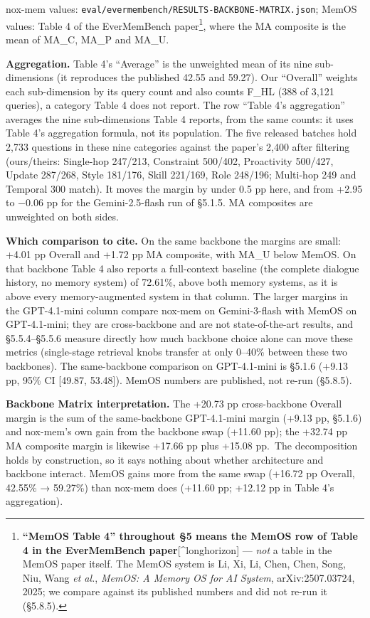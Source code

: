 \documentclass[
]{article}
\begin{document}
nox-mem values: \texttt{eval/evermembench/RESULTS-BACKBONE-MATRIX.json};
MemOS values: Table 4 of the EverMemBench paper\footnote{\textbf{``MemOS
  Table 4'' throughout §5 means the MemOS row of Table 4 in the
  EverMemBench paper}{[}\^{}longhorizon{]} --- \emph{not} a table in the
  MemOS paper itself. The MemOS system is Li, Xi, Li, Chen, Chen, Song,
  Niu, Wang \emph{et al.}, \emph{MemOS: A Memory OS for AI System},
  arXiv:2507.03724, 2025; we compare against its published numbers and
  did not re-run it (§5.8.5).}, where the MA composite is the mean of
MA\_C, MA\_P and MA\_U.

\textbf{Aggregation.} Table 4's ``Average'' is the unweighted mean of
its nine sub-dimensions (it reproduces the published 42.55 and 59.27).
Our ``Overall'' weights each sub-dimension by its query count and also
counts F\_HL (388 of 3,121 queries), a category Table 4 does not report.
The row ``Table 4's aggregation'' averages the nine sub-dimensions Table
4 reports, from the same counts: it uses Table 4's aggregation formula,
not its population. The five released batches hold 2,733 questions in
these nine categories against the paper's 2,400 after filtering
(ours/theirs: Single-hop 247/213, Constraint 500/402, Proactivity
500/427, Update 287/268, Style 181/176, Skill 221/169, Role 248/196;
Multi-hop 249 and Temporal 300 match). It moves the margin by under 0.5
pp here, and from +2.95 to −0.06 pp for the Gemini-2.5-flash run of
§5.1.5. MA composites are unweighted on both sides.

\textbf{Which comparison to cite.} On the same backbone the margins are
small: +4.01 pp Overall and +1.72 pp MA composite, with MA\_U below
MemOS. On that backbone Table 4 also reports a full-context baseline
(the complete dialogue history, no memory system) of 72.61\%, above both
memory systems, as it is above every memory-augmented system in that
column. The larger margins in the GPT-4.1-mini column compare nox-mem on
Gemini-3-flash with MemOS on GPT-4.1-mini; they are cross-backbone and
are not state-of-the-art results, and §5.5.4--§5.5.6 measure directly
how much backbone choice alone can move these metrics (single-stage
retrieval knobs transfer at only 0--40\% between these two backbones).
The same-backbone comparison on GPT-4.1-mini is §5.1.6 (+9.13 pp, 95\%
CI {[}49.87, 53.48{]}). MemOS numbers are published, not re-run
(§5.8.5).

\textbf{Backbone Matrix interpretation.} The +20.73 pp cross-backbone
Overall margin is the sum of the same-backbone GPT-4.1-mini margin
(+9.13 pp, §5.1.6) and nox-mem's own gain from the backbone swap (+11.60
pp); the +32.74 pp MA composite margin is likewise +17.66 pp plus +15.08
pp.~The decomposition holds by construction, so it says nothing about
whether architecture and backbone interact. MemOS gains more from the
same swap (+16.72 pp Overall, 42.55\% → 59.27\%) than nox-mem does
(+11.60 pp; +12.12 pp in Table 4's aggregation).
\end{document}
